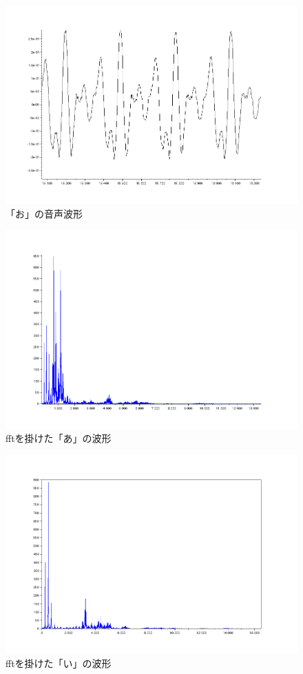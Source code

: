 \documentclass[12pt,oneside]{sotsuken_paper}
\begin{document}
\begin{figure}[htbp]
\begin{center}
\includegraphics[width=120mm]{img/o.png}
\caption{「お」の音声波形}
\label{fig:voice-o}
\end{center}
\end{figure}


\begin{figure}[htbp]
\begin{center}
\includegraphics[width=120mm]{img/a_fft.png}
\caption{fftを掛けた「あ」の波形}
\label{fig:a_fft}
\end{center}
\end{figure}


\begin{figure}[htbp]
\begin{center}
\includegraphics[width=120mm]{img/i_fft.png}
\caption{fftを掛けた「い」の波形}
\label{fig:i_fft}
\end{center}
\end{figure}
\end{document}
